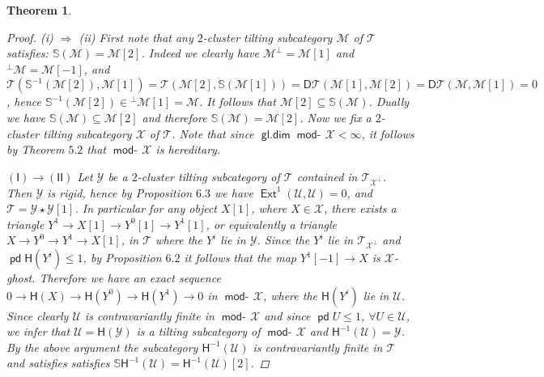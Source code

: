\documentclass[oneside, a4paper,reqno]{amsart}
\numberwithin{equation}{section}
\newtheorem{thm}{Theorem}[section]
\theoremstyle{definition}
\begin{document}
\begin{thm}
\begin{proof}
(i) $\Longrightarrow$ (ii) First note that any $2$-cluster tilting subcategory ${\mathcal M}$ of ${\mathcal T}$ satisfies: $\mathbb S({\mathcal M}) = {\mathcal M}[2]$. Indeed we clearly have ${\mathcal M}^{\bot} = {\mathcal M}[1]$ and ${^{\bot}}{\mathcal M} = {\mathcal M}[-1]$, and ${\mathcal T}(\mathbb S^{-1}({\mathcal M}[2]),{\mathcal M}[1]) = {\mathcal T}({\mathcal M}[2],\mathbb S({\mathcal M}[1])) =\mathsf{D}{\mathcal T}({\mathcal M}[1],{\mathcal M}[2]) = \mathsf{D}{\mathcal T}({\mathcal M},{\mathcal M}[1]) = 0$, hence $\mathbb S^{-1}({\mathcal M}[2]) \in {^{\bot}}{\mathcal M}[1] = {\mathcal M}$. It follows that ${\mathcal M}[2] \subseteq \mathbb S({\mathcal M})$. Dually we have $\mathbb S({\mathcal M}) \subseteq {\mathcal M}[2]$ and therefore $\mathbb S({\mathcal M}) = {\mathcal M}[2]$. Now we fix a $2$-cluster tilting subcategory ${\mathcal X}$ of ${\mathcal T}$. Note that since $\operatorname*{\mathsf{gl.dim}}\operatorname*{\mathsf{mod}-\!}{\mathcal X} < \infty$, it follows by Theorem $5.2$ that $\operatorname*{\mathsf{mod}-\!}{\mathcal X}$ is hereditary. 

$\mathsf{(I)} {\longrightarrow} \mathsf{(II)}$ Let ${\mathcal Y}$ be a $2$-cluster tilting subcategory of ${\mathcal T}$ contained in ${\mathcal T}_{{\mathcal X}^{\bot}}$. Then ${\mathcal Y}$ is rigid, hence by Proposition $6.3$ we have $\operatorname*{\mathsf{Ext}}^{1}({\mathcal U},{\mathcal U}) = 0$, and ${\mathcal T} = {\mathcal Y} \star {\mathcal Y}[1]$. In particular for any object $X[1]$, where $X \in {\mathcal X}$, there exists a triangle $Y^{1} {\longrightarrow} X[1] {\longrightarrow} Y^{0}[1] {\longrightarrow} Y^{1}[1]$, or equivalently a triangle $X{\longrightarrow} Y^{0} {\longrightarrow} Y^{1} {\longrightarrow} X[1]$, in ${\mathcal T}$ where the $Y^{i}$ lie in ${\mathcal Y}$. Since the $Y^{i}$ lie in ${\mathcal T}_{{\mathcal X}^{\bot}}$ and $\operatorname{\mathsf{pd}}\mathsf{H}(Y^{i}) \leq 1$, by Proposition $6.2$ it follows that the map $Y^{1}[-1]{\longrightarrow} X$ is ${\mathcal X}$-ghost. Therefore we have an exact sequence $0 {\longrightarrow} \mathsf{H}(X) {\longrightarrow} \mathsf{H}(Y^{0}) {\longrightarrow} \mathsf{H}(Y^{1}) {\longrightarrow} 0$ in $\operatorname*{\mathsf{mod}-\!}{\mathcal X}$, where the $\mathsf{H}(Y^{i})$ lie in ${\mathcal U}$. Since clearly ${\mathcal U}$ is contravariantly finite in $\operatorname*{\mathsf{mod}-\!}{\mathcal X}$ and since $\operatorname{\mathsf{pd}} U\leq 1$, $\forall U \in {\mathcal U}$, we infer that ${\mathcal U} = \mathsf{H}({\mathcal Y})$ is a tilting subcategory of $\operatorname*{\mathsf{mod}-\!}{\mathcal X}$ and $\mathsf{H}^{-1}({\mathcal U}) = {\mathcal Y}$. By the above argument the subcategory  $\mathsf{H}^{-1}({\mathcal U})$ is contravariantly finite in ${\mathcal T}$  and satisfies satisfies $\mathbb S\mathsf{H}^{-1}({\mathcal U}) = \mathsf{H}^{-1}({\mathcal U})[2]$.


\end{proof}
\end{thm}
\end{document}
